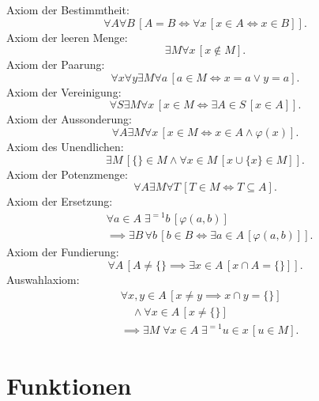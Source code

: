 Axiom der Bestimmtheit:
\begin{equation}
\forall A\forall B\,[A=B\iff\forall x\,[x\in A\Leftrightarrow x\in B]].
\end{equation}
Axiom der leeren Menge:
\begin{equation}
\exists M\forall x\,[x\notin M].
\end{equation}
Axiom der Paarung:
\begin{equation}
\forall x\forall y\exists M\forall a\,[a\in M\iff x=a\lor y=a].
\end{equation}
Axiom der Vereinigung:
\begin{equation}
\forall S\exists M\forall x\,[x\in M\iff\exists A{\in}S\,[x\in A]].
\end{equation}
Axiom der Aussonderung:
\begin{equation}
\forall A\exists M\forall x\,[x\in M\iff x\in A\land\varphi(x)].
\end{equation}
Axiom des Unendlichen:
\begin{equation}
\exists M\,[\{\}\in M\land\forall x{\in}M\,[x\cup\{x\}\in M]].
\end{equation}
Axiom der Potenzmenge:
\begin{equation}
\forall A\exists M\forall T\,[T\in M\iff T\subseteq A].
\end{equation}
Axiom der Ersetzung:
\begin{equation}
\begin{split}
&\forall a{\in}A\;\exists^{=1} b\,[\varphi(a,b)]\\
&\implies\exists B\,\forall b\,[b\in B\iff\exists a{\in}A\,[\varphi(a,b)]].
\end{split}
\end{equation}
Axiom der Fundierung:
\begin{equation}
\forall A\,[A\ne\{\}\implies\exists x{\in}A\,[x\cap A=\{\}]].
\end{equation}
Auswahlaxiom:
\begin{equation}
\begin{split}
&\forall x,y{\in}A\,[x\ne y\implies x\cap y=\{\}]\\
&\quad\land\forall x{\in}A\,[x\ne\{\}]\\
&\implies\exists M\;\forall x{\in}A\;\exists^{=1}u{\in}x\,[u\in M].
\end{split}
\end{equation}

\newpage
\section{Funktionen}
